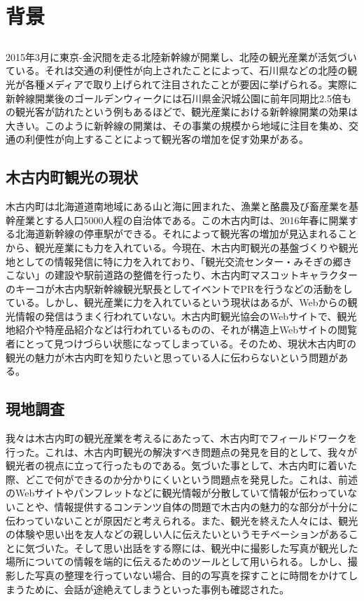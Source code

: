 \documentclass[openany,11pt,papersize]{jsbook}
\begin{document}
\tableofcontents%


\mainmatter%

\chapter{背景}

\section{}
2015年3月に東京-金沢間を走る北陸新幹線が開業し、北陸の観光産業が活気づいている。それは交通の利便性が向上されたことによって、石川県などの北陸の観光が各種メディアで取り上げられて注目されたことが要因に挙げられる。実際に新幹線開業後のゴールデンウィークには石川県金沢城公園に前年同期比2.5倍もの観光客が訪れたという例もあるほどで、観光産業における新幹線開業の効果は大きい。このように新幹線の開業は、その事業の規模から地域に注目を集め、交通の利便性が向上することによって観光客の増加を促す効果がある。

\section{木古内町観光の現状}
木古内町は北海道道南地域にある山と海に囲まれた、漁業と酪農及び畜産業を基幹産業とする人口5000人程の自治体である。この木古内町は、2016年春に開業する北海道新幹線の停車駅ができる。それによって観光客の増加が見込まれることから、観光産業にも力を入れている。今現在、木古内町観光の基盤づくりや観光地としての情報発信に特に力を入れており、「観光交流センター・みそぎの郷きこない」の建設や駅前道路の整備を行ったり、木古内町マスコットキャラクターのキーコが木古内駅新幹線観光駅長としてイベントでPRを行うなどの活動をしている。しかし、観光産業に力を入れているという現状はあるが、Webからの観光情報の発信はうまく行われていない。木古内町観光協会のWebサイトで、観光地紹介や特産品紹介などは行われているものの、それが構造上Webサイトの閲覧者にとって見つけづらい状態になってしまっている。そのため、現状木古内町の観光の魅力が木古内町を知りたいと思っている人に伝わらないという問題がある。

\section{現地調査}\label{sec:gaiyou}
我々は木古内町の観光産業を考えるにあたって、木古内町でフィールドワークを行った。これは、木古内町観光の解決すべき問題点の発見を目的として、我々が観光者の視点に立って行ったものである。気づいた事として、木古内町に着いた際、どこで何ができるのか分かりにくいという問題点を発見した。これは、前述のWebサイトやパンフレットなどに観光情報が分散していて情報が伝わっていないことや、情報提供するコンテンツ自体の問題で木古内の魅力的な部分が十分に伝わっていないことが原因だと考えられる。また、観光を終えた人々には、観光の体験や思い出を友人などの親しい人に伝えたいというモチベーションがあることに気づいた。そして思い出話をする際には、観光中に撮影した写真が観光した場所についての情報を端的に伝えるためのツールとして用いられる。しかし、撮影した写真の整理を行っていない場合、目的の写真を探すことに時間をかけてしまうために、会話が途絶えてしまうといった事例も確認された。
\end{document}
